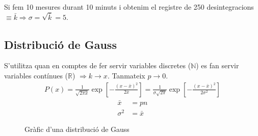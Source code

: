 Si fem 10 mesures durant 10 minuts i obtenim el registre de 250 desintegracions $\equiv \bar{k} \Rightarrow \sigma = \sqrt{\bar{k}} = 5$.

\subsection{Distribució de Gauss}
S'utilitza quan en comptes de fer servir variables discretes ($\mathbb{N}$) es fan servir variables contínues ($\mathbb{R}$) $\Rightarrow k \to x$. Tanmateix $p \to 0$.
\begin{align}
    P(x)= \frac{1}{\sqrt{2 \pi \bar{x}}} \exp \left[ - \frac{(x - \bar{x})^{2}}{2 \bar{x}} \right] = \frac{1}{\sigma \sqrt{2 \pi}} \exp \left[ - \frac{(x - \bar{x})^{2}}{2 \sigma^{2}} \right]
\end{align}
\begin{align}
    \bar{x} & = pn \\
    \sigma^{2} & = \bar{x}
\end{align}
\begin{figure}[H]
\centering
\caption{Gràfic d'una distribució de Gauss}
\end{figure}
